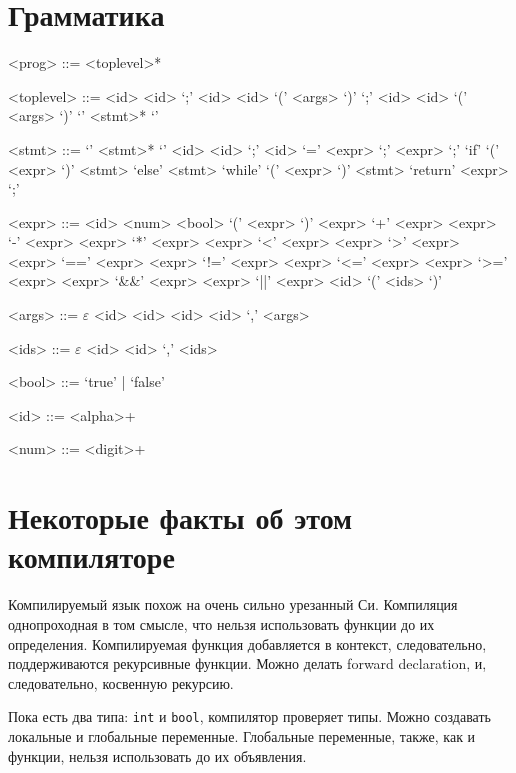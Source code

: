 \section{Грамматика}

\setlength{\grammarparsep}{20pt plus 1pt minus 1pt} %
\setlength{\grammarindent}{12em} %

\begin{grammar}

<prog> ::= <toplevel>*

<toplevel> ::= <id> <id> `;'
\alt <id> <id> `(' <args> `)' `;'
\alt <id> <id> `(' <args> `)' `{' <stmt>* `}'

<stmt> ::= `{' <stmt>* `}'
\alt <id> <id> `;'
\alt <id> `=' <expr> `;'
\alt <expr> `;'
\alt `if' `(' <expr> `)' <stmt> `else' <stmt>
\alt `while' `(' <expr> `)' <stmt>
\alt `return' <expr> `;'

<expr> ::= <id> 
\alt <num>
\alt <bool>
\alt `(' <expr> `)'
\alt <expr> `+' <expr>
\alt <expr> `-' <expr>
\alt <expr> `*' <expr>
\alt <expr> `<' <expr>
\alt <expr> `>' <expr>
\alt <expr> `==' <expr>
\alt <expr> `!=' <expr>
\alt <expr> `<=' <expr>
\alt <expr> `>=' <expr>
\alt <expr> `&&' <expr>
\alt <expr> `||' <expr>
\alt <id> `(' <ids> `)'

<args> ::= $\varepsilon$
\alt <id> <id>
\alt <id> <id> `,' <args>

<ids> ::= $\varepsilon$
\alt <id>
\alt <id> `,' <ids>

<bool> ::= `true' | `false'

<id> ::= <alpha>+

<num> ::= <digit>+

\end{grammar}

\section{Некоторые факты об этом компиляторе}

Компилируемый язык похож на очень сильно урезанный Си. Компиляция
однопроходная в том смысле, что нельзя использовать функции до их
определения. Компилируемая функция добавляется в контекст,
следовательно, поддерживаются рекурсивные функции. Можно делать
forward declaration, и, следовательно, косвенную рекурсию. 

Пока есть два типа: \texttt{int} и \texttt{bool}, компилятор проверяет
типы. Можно создавать локальные и глобальные переменные.
Глобальные переменные, также, как и функции, нельзя использовать до их
объявления. 


